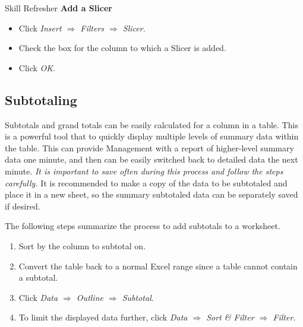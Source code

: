 \begin{center}
	\begin{sklbox}{Skill Refresher}
		\textbf{Add a Slicer}
		\\
		\begin{itemize}
			\setlength{\itemsep}{0pt}
			\setlength{\parskip}{0pt}
			\setlength{\parsep}{0pt}

			\item Click \textit{Insert $ \Rightarrow $ Filters $ \Rightarrow $ Slicer}.
			\item Check the box for the column to which a Slicer is added.
			\item Click \textit{OK}.
			
		\end{itemize}
	\end{sklbox}
\end{center}

\subsection{Subtotaling}

Subtotals and grand totals can be easily calculated for a column in a table. This is a powerful tool that to quickly display multiple levels of summary data within the table. This can provide Management with a report of higher-level summary data one minute, and then can be easily switched back to detailed data the next minute. \textit{It is important to save often during this process and follow the steps carefully.} It is recommended to make a copy of the data to be subtotaled and place it in a new sheet, so the summary subtotaled data can be separately saved if desired.

The following steps summarize the process to add subtotals to a worksheet.

\begin{enumbox}
	\begin{enumerate}
		\item Sort by the column to subtotal on.
		\item Convert the table back to a normal Excel range since a table cannot contain a subtotal.
		\item Click \textit{Data $ \Rightarrow $ Outline $ \Rightarrow $ Subtotal}.
		\item To limit the displayed data further, click \textit{Data $ \Rightarrow $ Sort \& Filter $ \Rightarrow $ Filter}.
	\end{enumerate}
\end{enumbox}
	
